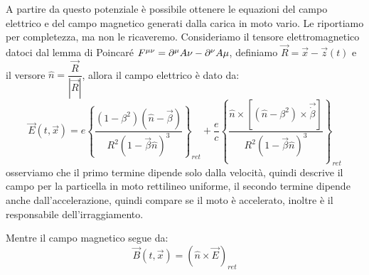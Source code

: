 A partire da questo potenziale è possibile ottenere le equazioni del campo elettrico e del campo magnetico generati dalla carica in moto vario. Le riportiamo per completezza, ma non le ricaveremo. Consideriamo il tensore elettromagnetico datoci dal lemma di Poincaré $F\indices{^{\mu\nu}}=\partial^\mu A\nu-\partial^\nu A\mu$, definiamo $\Vec{R}=\Vec{x}-\Vec{z}(t)$ e il versore $\hat{n}=\dfrac{\Vec{R}}{|\Vec{R}|}$, allora il campo elettrico è dato da:
\begin{equation}
    \Vec{E}(t,\Vec{x})=e\left\{\dfrac{(1-\beta^2)(\hat{n}-\Vec{\beta})}{R^2(1-\Vec{\beta}\hat{n})^3} \right\}_{ret}+\dfrac{e}{c}\left\{\dfrac{\hat{n}\times[(\hat{n}-\beta^2)\times \Vec{\dot{\beta}}]}{R^2(1-\Vec{\beta}\hat{n})^3} \right\}_{ret}
\end{equation}
osserviamo che il primo termine dipende solo dalla velocità, quindi descrive il campo per la particella in moto rettilineo uniforme, il secondo termine dipende anche dall'accelerazione, quindi compare se il moto è accelerato, inoltre è il responsabile dell'irraggiamento.

Mentre il campo magnetico segue da:
\begin{equation}
    \Vec{B}(t,\Vec{x})=\left(\hat{n}\times\Vec{E}\right)_{ret}
\end{equation}